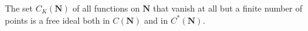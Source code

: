 The set $C_K(\mathbf{N})$ of all functions on $\mathbf{N}$ that vanish at all but a finite number of points is a free ideal both in $C(\mathbf{N})$ and in $C^*(\mathbf{N})$.

